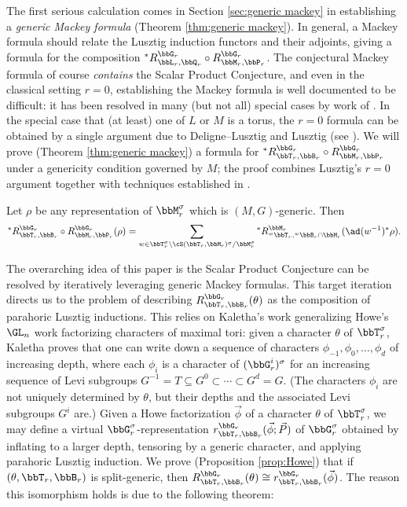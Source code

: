 The first serious calculation comes in Section \ref{sec:generic mackey} in establishing a \textit{generic Mackey formula} (Theorem \ref{thm:generic mackey}). In general, a Mackey formula should relate the Lusztig induction functors and their adjoints, giving a formula for the composition ${}^* R_{\bbL_r,\bbQ_r}^{\bbG_r} \circ R_{\bbM_r,\bbP_r}^{\bbG_r}$. The conjectural Mackey formula of course \textit{contains} the Scalar Product Conjecture, and even in the classical setting $r=0$, establishing the Mackey formula is well documented to be difficult: it has been resolved in many (but not all) special cases by work of \cite{DL83,DM20,BMM93,BM11,Tay18,Lus20a}. In the special case that (at least) one of $L$ or $M$ is a torus, the $r=0$ formula can be obtained by a single argument due to Deligne--Lusztig \cite{DL83} and Lusztig (see \cite{DM20}). We will prove (Theorem \ref{thm:generic mackey}) a formula for ${}^*R_{\bbT_r,\bbB_r}^{\bbG_r} \circ R_{\bbM_r,\bbP_r}^{\bbG_r}$ under a genericity condition governed by $M$; the proof combines Lusztig's $r=0$ argument together with techniques established in \cite{Lus04,Sta09,CI21-RT}. 
\begin{displaytheorem}\label{thm:display mackey}
  Let $\rho$ be any representation of $\bbM_r^\sigma$ which is $(M,G)$-generic. Then
  \begin{equation*}
    {}^*R_{\bbT_r, \bbB_r}^{\bbG_r} \circ R_{\bbM_r, \bbP_r}^{\bbG_r}(\rho)  = \sum_{w \in \bbT_r^\sigma \backslash \cS(\bbT_r, \bbM_r)^\sigma/\bbM_r^\sigma} {}^* R_{{}^w\bbT_r, {}^w\bbB_r \cap \bbM_r}^{\bbM_r}(\ad(w^{-1})^*\rho).
  \end{equation*}
\end{displaytheorem}

The overarching idea of this paper is the Scalar Product Conjecture can be resolved by iteratively leveraging generic Mackey formulas. This target iteration directs us to the problem of describing $R_{\bbT_r,\bbB_r}^{\bbG_r}(\theta)$ as the composition of parahoric Lusztig inductions. This relies on Kaletha's work \cite{Kal19} generalizing Howe's $\GL_n$ work \cite{How77} factorizing characters of maximal tori: given a character $\theta$ of $\bbT_r^\sigma$, Kaletha proves that one can write down a sequence of characters $\phi_{-1}, \phi_0, \ldots, \phi_d$ of increasing depth, where each $\phi_i$ is a character of $(\bbG_r^i)^\sigma$ for an increasing sequence of Levi subgroups $G^{-1} = T \subseteq G^0 \subset \cdots \subset G^d = G$. (The characters $\phi_i$ are not uniquely determined by $\theta$, but their depths and the associated Levi subgroups $G^i$ are.) Given a Howe factorization $\vec \phi$ of a character $\theta$ of $\bbT_r^\sigma$, we may define a virtual $\bbG_r^\sigma$-representation $r_{\bbT_r,\bbB_r}^{\bbG_r}(\vec \phi; \vec P)$ of $\bbG_r^\sigma$ obtained by inflating to a larger depth, tensoring by a generic character, and applying parahoric Lusztig induction. We prove (Proposition \ref{prop:Howe}) that if $(\theta,\bbT_r,\bbB_r)$ is split-generic, then $R_{\bbT_r,\bbB_r}^{\bbG_r}(\theta) \cong r_{\bbT_r,\bbB_r}^{\bbG_r}(\vec \phi)$. The reason this isomorphism holds is due to the following theorem:

